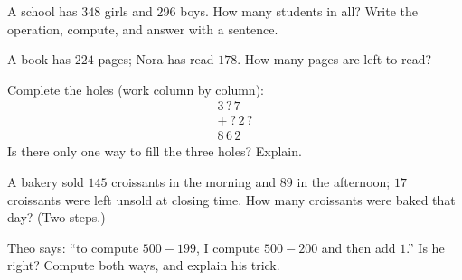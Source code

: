 \begin{exercise}[$\star$]\label{exo:g3:addsub:7}
A school has $348$ girls and $296$ boys. How many students in all?
Write the operation, compute, and answer with a sentence.
\end{exercise}

\begin{exercise}[$\star$]\label{exo:g3:addsub:8}
A book has $224$ pages; Nora has read $178$. How many pages are left
to read?
\end{exercise}

\begin{exercise}[$\star$]\label{exo:g3:addsub:9}
Complete the holes (work column by column):
\[
\begin{array}{r}
3\,?\,7 \\
+\ ?\,2\,? \\
\hline
8\,6\,2
\end{array}
\]
Is there only one way to fill the three holes? Explain.
\end{exercise}

\begin{exercise}[$\star\star$]\label{exo:g3:addsub:10}
A bakery sold $145$ croissants in the morning and $89$ in the
afternoon; $17$ croissants were left unsold at closing time. How many
croissants were baked that day? (Two steps.)
\end{exercise}

\begin{exercise}[$\star\star$]\label{exo:g3:addsub:11}
Theo says: ``to compute $500 - 199$, I compute $500 - 200$ and then
add $1$.'' Is he right? Compute both ways, and explain his trick.
\end{exercise}
